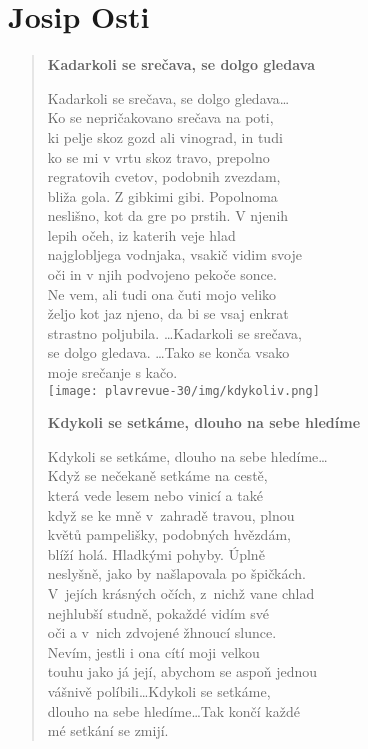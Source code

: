 \section{Josip Osti}

\begin{verse}

\textbf{Kadarkoli se srečava, se dolgo gledava}

\medskip

Kadarkoli se srečava, se dolgo gledava\dots\\
Ko se nepričakovano srečava na poti,\\
ki pelje skoz gozd ali vinograd, in tudi \\
ko se mi v vrtu skoz travo, prepolno \\
regratovih cvetov, podobnih zvezdam,\\
bliža gola. Z gibkimi gibi. Popolnoma\\
neslišno, kot da gre po prstih. V njenih \\
lepih očeh, iz katerih veje hlad\\
najglobljega vodnjaka, vsakič vidim svoje \\
oči in v njih podvojeno pekoče sonce. \\
Ne vem, ali tudi ona čuti mojo veliko \\
željo kot jaz njeno, da bi se vsaj enkrat \\
strastno poljubila. \dots Kadarkoli se srečava, \\
se dolgo gledava. \dots Tako se konča vsako \\
moje srečanje s kačo. \\

\bigskip
\texttt{[image: plavrevue-30/img/kdykoliv.png]}
\bigskip

\textbf{Kdykoli se setkáme, dlouho na sebe hledíme}
\medskip

Kdykoli se setkáme, dlouho na sebe hledíme\ldots \\
Když se nečekaně setkáme na cestě, \\
která vede lesem nebo vinicí a také \\
když se ke mně v zahradě travou, plnou \\
květů pampelišky, podobných hvězdám, \\
blíží holá. Hladkými pohyby. Úplně \\
neslyšně, jako by našlapovala po špičkách. \\
V jejích krásných očích, z nichž vane chlad \\
nejhlubší studně, pokaždé vidím své \\
oči a v nich zdvojené žhnoucí slunce. \\
Nevím, jestli i ona cítí moji velkou  \\
touhu jako já její, abychom se aspoň jednou \\
vášnivě políbili\ldots Kdykoli se setkáme, \\
dlouho na sebe hledíme\ldots Tak končí každé \\
mé setkání se zmijí.


\medskip


\end{verse}



